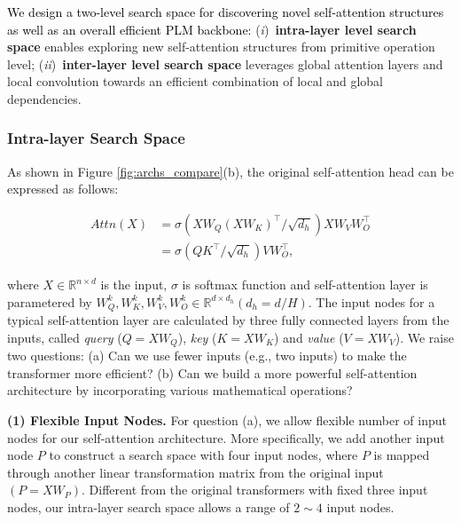 \documentclass[letterpaper]{article} \usepackage{aaai22}  \usepackage{times}  \usepackage{helvet}  \usepackage{courier}  \usepackage[hyphens]{url}  \usepackage{graphicx} \urlstyle{rm} \def\UrlFont{\rm}  \usepackage{natbib}  \usepackage{caption} \DeclareCaptionStyle{ruled}{labelfont=normalfont,labelsep=colon,strut=off} \frenchspacing  \setlength{\pdfpagewidth}{8.5in}  \setlength{\pdfpageheight}{11in}  \usepackage{algorithm}
\newcommand{\Ni}{({\em i})~}
\newcommand{\Nii}{({\em ii})~}
\newcommand{\prj}[1]{\textcolor{black}{#1}} \newcommand{\prjj}[1]{\textcolor{black}{#1}} \newcommand{\jhh}[1]{\textcolor{black}{#1}} \newcommand{\jh}[1]{\textcolor{black}{#1}} \newcommand{\sh}[1]{\textcolor{black}{#1}} \usepackage{multirow}
\begin{document}
\prj{We design a two-level search space for discovering novel self-attention structures as well as an overall efficient PLM backbone:}
\Ni \textbf{intra-layer level search space} enables exploring new self-attention structures from primitive operation level; 
\Nii \textbf{inter-layer level search space} leverages global attention layers and local convolution towards an efficient combination of local and global dependencies.



\subsubsection{Intra-layer Search Space}

As shown in Figure \ref{fig:archs_compare}(b), the original self-attention head can be expressed as follows:
\vspace{-1mm}
\begin{small}
\begin{align}
    Attn(X)
    &=\sigma(XW_{Q}(XW_{K})^{\top}/\sqrt{d_h})XW_{V}W_{O}^{\top}\\
    &=\sigma(QK^{\top}/\sqrt{d_h})VW_{O}^{\top}, \label{eq:attn}
\end{align}
\label{equ:self-att}
\end{small}
\hspace{-1.5mm}where $X\in\mathbb{R}^{n\times d}$ is the input, $\sigma$ is softmax
function and self-attention layer is parametered by $W_{Q}^{k},W_{K}^{k},W_{V}^{k},W_{O}^{k}\in\mathbb{R}^{d\times d_{h}}(d_{h}=d/H)$.
The input nodes for a
typical self-attention layer are calculated by three fully connected layers from the inputs, called \textit{query} ($Q=XW_Q$), \textit{key} ($K=XW_K$) and \textit{value} ($V=XW_V$).
We raise two questions: (a) Can we use fewer inputs (e.g., two inputs) to make the transformer more efficient? (b) Can we build a more powerful self-attention architecture by incorporating various mathematical operations?




\textbf{(1) Flexible Input Nodes.}
For question (a), we allow flexible number of
input nodes for our self-attention architecture. More specifically,
we add another input node $P$ to construct a search space with four
input nodes, where $P$ is mapped through another linear transformation
matrix from the original input $(P=XW_P)$. Different from the original transformers
with fixed three input nodes, our intra-layer search space allows a
range of $2\sim 4$ input nodes.
\end{document}
